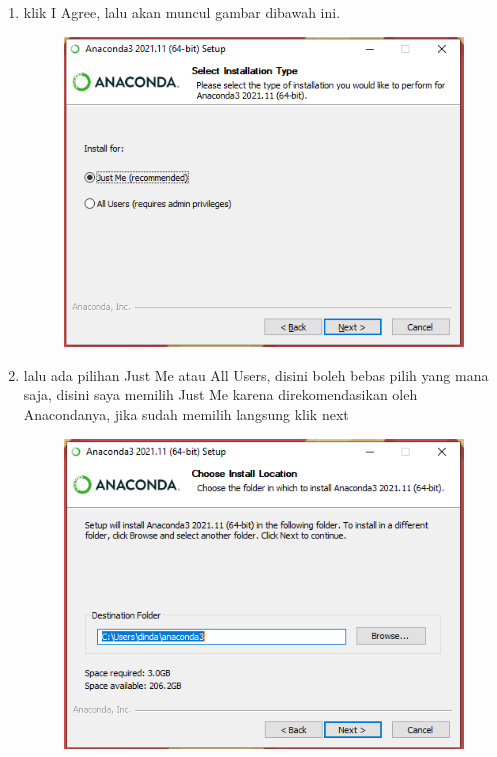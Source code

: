 \begin{enumerate}
\begin{figure}[H]
        \label{instalanacondawindowsstep2}
\end{figure}
\item klik I Agree, lalu akan muncul gambar dibawah ini.
\begin{figure}[H]
        \centerline{\includegraphics[scale=0.75]{figures/instalasi-anaconda-windows/step3}}
        \label{instalanacondawindowsstep3}
\end{figure}
\item lalu ada pilihan Just Me atau All Users, disini boleh bebas pilih yang mana saja, disini saya memilih Just Me karena direkomendasikan oleh Anacondanya, jika sudah memilih langsung klik next
\begin{figure}[H]
        \centerline{\includegraphics[scale=0.75]{figures/instalasi-anaconda-windows/step4}}

\end{figure}
\end{enumerate}
